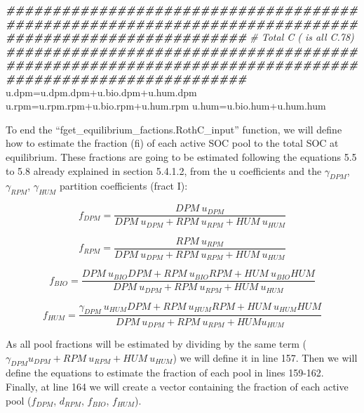 \documentclass[
  10pt,
  b5paper,
]{book}
\newenvironment{Shaded}{\begin{snugshade}}{\end{snugshade}}
\newcommand{\CommentTok}[1]{\textcolor[rgb]{0.56,0.35,0.01}{\textit{#1}}}
\newcommand{\DocumentationTok}[1]{\textcolor[rgb]{0.56,0.35,0.01}{\textbf{\textit{#1}}}}
\newcommand{\NormalTok}[1]{#1}
\newcommand{\OtherTok}[1]{\textcolor[rgb]{0.56,0.35,0.01}{#1}}
\newcommand{\SpecialCharTok}[1]{\textcolor[rgb]{0.00,0.00,0.00}{#1}}
\begin{document}
\begin{Shaded}
\begin{Highlighting}[]
  \DocumentationTok{\#\#\#\#\#\#\#\#\#\#\#\#\#\#\#\#\#\#\#\#\#\#\#\#\#\#\#\#\#\#\#\#\#\#\#\#\#\#\#\#\#\#\#\#\#\#\#\#\#\#\#\#\#\#\#\#\#\#\#\#\#\#\#\#\#\#\#\#\#\#\#\#\#\#\#\#\#\#\#\#\#\#\#\#\#\#\#\#\#\#\#\#\#\#\#\#\#\#\#\#\#\#}
  \CommentTok{\# Total C ( is all C.78)}
  \DocumentationTok{\#\#\#\#\#\#\#\#\#\#\#\#\#\#\#\#\#\#\#\#\#\#\#\#\#\#\#\#\#\#\#\#\#\#\#\#\#\#\#\#\#\#\#\#\#\#\#\#\#\#\#\#\#\#\#\#\#\#\#\#\#\#\#\#\#\#\#\#\#\#\#\#\#\#\#\#\#\#\#\#\#\#\#\#\#\#\#\#\#\#\#\#\#\#\#\#\#\#\#\#\#\#}
\NormalTok{  u.dpm}\OtherTok{=}\NormalTok{u.dpm.dpm}\SpecialCharTok{+}\NormalTok{u.bio.dpm}\SpecialCharTok{+}\NormalTok{u.hum.dpm}
\NormalTok{  u.rpm}\OtherTok{=}\NormalTok{u.rpm.rpm}\SpecialCharTok{+}\NormalTok{u.bio.rpm}\SpecialCharTok{+}\NormalTok{u.hum.rpm}
\NormalTok{  u.hum}\OtherTok{=}\NormalTok{u.bio.hum}\SpecialCharTok{+}\NormalTok{u.hum.hum}
\end{Highlighting}
\end{Shaded}

To end the ``fget\_equilibrium\_factions.RothC\_input'' function, we will define how to estimate the fraction (fi) of each active SOC pool to the total SOC at equilibrium. These fractions are going to be estimated following the equations 5.5 to 5.8 already explained in section 5.4.1.2, from the u coefficients and the \(\gamma_{DPM}\), \(\gamma_{RPM}\), \(\gamma_{HUM}\) partition coefficients (fract I):

\begin{equation}
\tag{5.5}
f_{DPM} = \frac{DPM\ u_{DPM}}{DPM\ u_{DPM} + RPM\ u_{RPM}+ HUM\ u_{HUM}}  
\end{equation}

\begin{equation}
\tag{5.6}
f_{RPM} = \frac{RPM\ u_{RPM}}{DPM\ u_{DPM}+ RPM\ u_{RPM} +HUM\ u_{HUM}}
\end{equation}

\begin{equation}
\tag{5.7}
f_{BIO} = \frac{DPM\ u_{BIO}  DPM + RPM\ u_{BIO}  RPM + HUM\ u_{BIO}  HUM}{DPM \ u_{DPM} + RPM\ u_{RPM} +HUM\ u_{HUM}}
\end{equation}

\begin{equation}
\tag{5.8}
f_{HUM} = \frac{\gamma_{DPM} \ u_{HUM} DPM+ RPM\ u_{HUM} RPM + HUM\ u_{HUM} HUM}{DPM\ u_{DPM} + RPM\ u_{RPM}+ HUM u_{HUM}}
\end{equation}

As all pool fractions will be estimated by dividing by the same term (\(\gamma_{DPM}u_{DPM}+RPM\ u_{RPM}+HUM\ u_{HUM}\)) we will define it in line 157. Then we will define the equations to estimate the fraction of each pool in lines 159-162. Finally, at line 164 we will create a vector containing the fraction of each active pool (\(f_{DPM}\), \(d_{RPM}\), \(f_{BIO}\), \(f_{HUM}\)).
\end{document}
